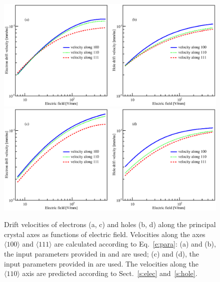 \documentclass[epj]{svjour}
\begin{document}
\begin{figure}[htpb]
\centering
\includegraphics[width=0.8\linewidth]{VvsElucian} 
\includegraphics[width=0.8\linewidth]{VvsEbart} 
\caption{Drift velocities of electrons (a, c) and holes (b, d) along
the principal crystal axes as functions of electric field. Velocities
along the axes $\langle 100 \rangle$ and $\langle 111 \rangle$ are
calculated according to Eq.~\ref{e:para}: (a) and (b), the input
parameters provided in \cite{miha} and \cite{reg} are used; (c) and
(d), the input parameters provided in \cite{bart} are used. The
velocities along the $\langle 110 \rangle$ axis are predicted
according to Sect.~\ref{s:elec} and~\ref{s:hole}.}
\label{f:vvse} 
\end{figure} 
\end{document}

